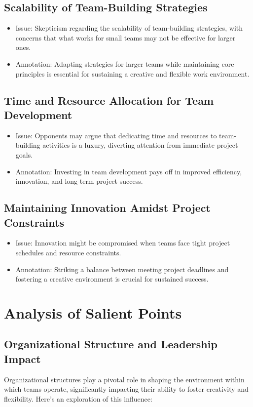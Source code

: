 \documentclass[a4paper, twoside]{article}
\begin{document}
\subsection{Scalability of Team-Building Strategies}
\begin{itemize}
  \item{Issue}: Skepticism regarding the scalability of team-building strategies, with concerns that what works for small teams may not be effective for larger ones.
  \item{Annotation}: Adapting strategies for larger teams while maintaining core principles is essential for sustaining a creative and flexible work environment.\cite{Hackman2002}
\end{itemize}

\subsection{Time and Resource Allocation for Team Development}
\begin{itemize}
  \item{Issue}: Opponents may argue that dedicating time and resources to team-building activities is a luxury, diverting attention from immediate project goals.
  \item{Annotation}: Investing in team development pays off in improved efficiency, innovation, and long-term project success.\cite{Katzenbach1993}
\end{itemize}

\subsection{Maintaining Innovation Amidst Project Constraints}
\begin{itemize}
  \item{Issue}:  Innovation might be compromised when teams face tight project schedules and resource constraints.
  \item{Annotation}: Striking a balance between meeting project deadlines and fostering a creative environment is crucial for sustained success.\cite{Amabile2011}
\end{itemize}




\section{Analysis of Salient Points}

\subsection{Organizational Structure and Leadership Impact}
Organizational structures play a pivotal role in shaping the environment within which teams operate, significantly impacting their ability to foster creativity and flexibility. Here's an exploration of this influence:
\end{document}
